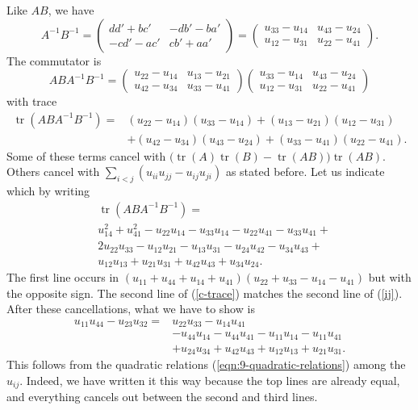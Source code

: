 \documentclass[11pt]{amsart}
\theoremstyle{definition}
\numberwithin{figure}{section}
\numberwithin{equation}{section}
\numberwithin{table}{section}
\newcommand{\tr}{\operatorname{tr}}
\begin{document}
Like $AB$, we have
\[
A^{-1}B^{-1} = \begin{pmatrix} dd'+bc' & -db'-ba' \\ -cd'-ac' & cb'+aa' \end{pmatrix} =
\begin{pmatrix} u_{33}-u_{14} & u_{43}-u_{24} \\ u_{12}-u_{31} & u_{22}-u_{41} \end{pmatrix}
.
\]
The commutator is
\[
ABA^{-1}B^{-1} = \begin{pmatrix} u_{22}-u_{14} & u_{13}-u_{21} \\ u_{42}-u_{34} & u_{33}-u_{41} \end{pmatrix}
\begin{pmatrix} u_{33}-u_{14} & u_{43}-u_{24} \\ u_{12}-u_{31} & u_{22}-u_{41} \end{pmatrix}
\]
with trace
\begin{align*}
\tr(ABA^{-1}B^{-1}) =&(u_{22}-u_{14})(u_{33}-u_{14})+(u_{13}-u_{21})(u_{12}-u_{31}) \\
&+ (u_{42}-u_{34})(u_{43}-u_{24})+(u_{33}-u_{41})(u_{22}-u_{41})
.
\end{align*}
Some of these terms cancel with $\big(\tr(A)\tr(B)-\tr(AB) \big)\tr(AB)$.
Others cancel with $\sum_{i<j} (u_{ii}u_{jj}-u_{ij}u_{ji})$ as stated before.
Let us indicate which by writing
\begin{align}
&\tr(ABA^{-1}B^{-1}) = \label{c-trace} \\
&u_{14}^2+u_{41}^2-u_{22}u_{14}-u_{33}u_{14}-u_{22}u_{41}-u_{33}u_{41}+ \nonumber \\
&2 u_{22}u_{33}-u_{12}u_{21}-u_{13}u_{31}-u_{24}u_{42}-u_{34}u_{43} + \nonumber \\
&u_{12}u_{13}+u_{21}u_{31}+u_{42}u_{43}+u_{34}u_{24} \nonumber
.
\end{align}
The first line occurs in $(u_{11}+u_{44}+u_{14}+u_{41})(u_{22}+u_{33}-u_{14}-u_{41})$ but with the opposite sign.
The second line of (\ref{c-trace}) matches the second line of (\ref{ij}).
After these cancellations, what we have to show is
\begin{align*}
u_{11}u_{44} - u_{23}u_{32} = &u_{22}u_{33} - u_{14}u_{41} \\
&-u_{44}u_{14}-u_{44}u_{41}-u_{11}u_{14}-u_{11}u_{41} \\
&+u_{24}u_{34}+u_{42}u_{43}+u_{12}u_{13} + u_{21}u_{31}
.
\end{align*}
This follows from the quadratic relations (\ref{eqn:9-quadratic-relations}) among the $u_{ij}$.
Indeed, we have written it this way because the top lines are already equal, and everything cancels out between the second and third lines.
\end{document}
